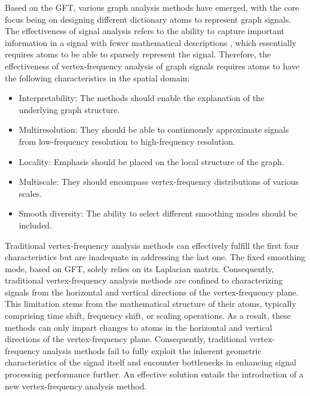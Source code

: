 \documentclass[lettersize,journal]{IEEEtran}
\begin{document}
Based on the GFT, various graph analysis methods have emerged, with the core focus being on designing different dictionary atoms to represent graph signals. The effectiveness of signal analysis refers to the ability to capture important information in a signal with fewer mathematical descriptions \cite{rubinstein2010dictionaries}, which essentially requires atoms to be able to sparsely represent the signal. 
Therefore, the effectiveness of vertex-frequency analysis of graph signals requires atoms to have the following characteristics in the spatial domain:
\begin{itemize}
	\item Interpretability: The methods should enable the explanation of the underlying graph structure.
	\item Multiresolution: They should be able to continuously approximate signals from low-frequency resolution to high-frequency resolution.
	\item Locality: Emphasis should be placed on the local structure of the graph.
	\item Multiscale: They should encompass vertex-frequency distributions of various scales.
	\item Smooth diversity: The ability to select different smoothing modes should be included.
\end{itemize}
Traditional vertex-frequency analysis methods can effectively fulfill the first four characteristics but are inadequate in addressing the last one\cite{stankovic2017vertex, stankovic2020vertex, shuman2012windowed}. The fixed smoothing mode, based on GFT, solely relies on its Laplacian matrix. Consequently, traditional vertex-frequency analysis methods are confined to characterizing signals from the horizontal and vertical directions of the vertex-frequency plane. This limitation stems from the mathematical structure of their atoms, typically comprising time shift, frequency shift, or scaling operations. As a result, these methods can only impart changes to atoms in the horizontal and vertical directions of the vertex-frequency plane\cite{shuman2016vertex, stankovic2019vertex}. Consequently, traditional vertex-frequency analysis methods fail to fully exploit the inherent geometric characteristics of the signal itself and encounter bottlenecks in enhancing signal processing performance further. An effective solution entails the introduction of a new vertex-frequency analysis method.
\end{document}
